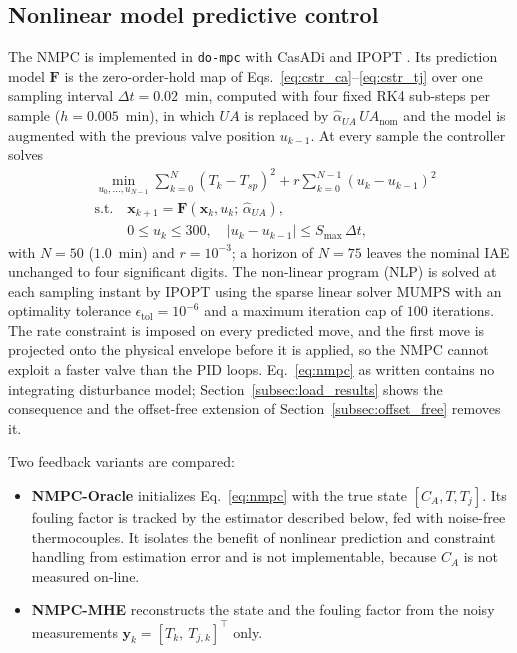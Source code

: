 \subsection{Nonlinear model predictive control}
\label{subsec:nmpc}
The NMPC is implemented in \texttt{do-mpc} with CasADi and IPOPT \cite{fiedler2023dompc, rawlings2020model}. Its prediction model $\mathbf{F}$ is the zero-order-hold map of Eqs.~\eqref{eq:cstr_ca}--\eqref{eq:cstr_tj} over one sampling interval $\Delta t = 0.02$~min, computed with four fixed RK4 sub-steps per sample ($h = 0.005$~min), in which $UA$ is replaced by $\hat\alpha_{UA}\,UA_{\text{nom}}$ and the model is augmented with the previous valve position $u_{k-1}$. At every sample the controller solves
\begin{align}
    &\min_{u_0,\dots,u_{N-1}} \sum_{k=0}^{N} \left(T_k - T_{sp}\right)^2 + r\sum_{k=0}^{N-1}(u_k - u_{k-1})^2 \nonumber \\
    &\text{s.t.} \quad \mathbf{x}_{k+1} = \mathbf{F}(\mathbf{x}_k, u_k;\, \hat\alpha_{UA}), \nonumber \\
    &\phantom{\text{s.t.}} \quad 0 \le u_k \le 300, \quad |u_k - u_{k-1}| \le S_{\max}\,\Delta t,
    \label{eq:nmpc}
\end{align}
with $N = 50$ ($1.0$~min) and $r = 10^{-3}$; a horizon of $N = 75$ leaves the nominal IAE unchanged to four significant digits. The non-linear program (NLP) is solved at each sampling instant by IPOPT using the sparse linear solver MUMPS with an optimality tolerance $\epsilon_{\text{tol}} = 10^{-6}$ and a maximum iteration cap of $100$ iterations. The rate constraint is imposed on every predicted move, and the first move is projected onto the physical envelope before it is applied, so the NMPC cannot exploit a faster valve than the PID loops. Eq.~\eqref{eq:nmpc} as written contains no integrating disturbance model; Section~\ref{subsec:load_results} shows the consequence and the offset-free extension of Section~\ref{subsec:offset_free} removes it.

Two feedback variants are compared:
\begin{itemize}
    \item \textbf{NMPC-Oracle} initializes Eq.~\eqref{eq:nmpc} with the true state $[C_A, T, T_j]$. Its fouling factor is tracked by the estimator described below, fed with noise-free thermocouples. It isolates the benefit of nonlinear prediction and constraint handling from estimation error and is not implementable, because $C_A$ is not measured on-line.
    \item \textbf{NMPC-MHE} reconstructs the state and the fouling factor from the noisy measurements $\mathbf{y}_k = [T_k,\ T_{j,k}]^\top$ only.
\end{itemize}

